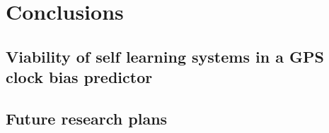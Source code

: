 
\chapter{Conclusions}

\section{Viability of self learning systems in a GPS clock bias predictor}

\section{Future research plans}

